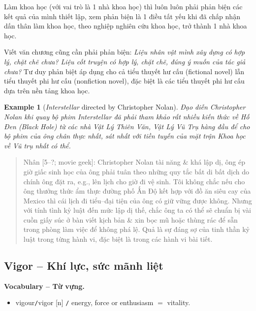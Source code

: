 \documentclass[12pt,oneside]{book}
\newtheorem{example}{Example}
\begin{document}
Làm khoa học (với vai trò là 1 nhà khoa học) thì luôn luôn phải phản biện các kết quả của mình thiết lập, xem phản biện là 1 điều tất yếu khi đã chấp nhận dấn thân làm khoa học, theo nghiệp nghiên cứu khoa học, trở thành 1 nhà khoa học.

Viết văn chương cũng cần phải phản biện: {\it Liệu nhân vật mình xây dựng có hợp lý, chặt chẽ chưa? Liệu cốt truyện có hợp lý, chặt chẽ, đúng ý muốn của tác giả chưa?} Tư duy phản biệt áp dụng cho cả tiểu thuyết hư cấu (fictional novel) lẫn tiểu thuyết phi hư cấu (nonfiction novel), đặc biệt là các tiểu thuyết phi hư cấu dựa trên nền tảng khoa học.

\begin{example}[{\it Interstellar} directed by {\sc Christopher Nolan}]
	Đạo diễn {\sc Christopher Nolan} khi quay bộ phim Interstellar đã phải tham khảo rất nhiều kiến thức về Hố Đen (Black Hole) từ các nhà Vật Lý Thiên Văn, Vật Lý Vũ Trụ hàng đầu để cho bộ phim của ông chân thực nhất, sát nhất với tiền tuyến của mặt trận Khoa học về Vũ trụ nhất có thể.
\end{example}

\begin{quote}
	{\sf Nhân [5--?; movie geek]}: {\sc Christopher Nolan} tài năng \& khá lập dị, ông ép giờ giấc sinh học của ông phải tuân theo những quy tắc bất di bất dịch do chính ông đặt ra, e.g., lên lịch cho giờ đi vệ sinh. Tôi không chắc nếu cho ông thưởng thức ẩm thực đường phố Ấn Độ kết hợp với đồ ăn siêu cay của Mexico thì cái lịch đi tiểu--đại tiện của ông có giữ vững được không. Nhưng với tính tình kỷ luật đến mức lập dị thế, chắc ông ta có thể sẽ chuẩn bị vài cuồn giấy súc ở bàn viết kịch bản \& xin bọc mũ hoặc thùng rác để sẵn trong phòng làm việc để không phá lệ. Quả là sự đáng sợ của tinh thần kỷ luật trong từng hành vi, đặc biệt là trong các hành vi bài tiết.
\end{quote}

\subsection{Vigor -- Khí lực, sức mãnh liệt}
\textbf{\textsf{\small Vocabulary -- Từ vựng.}}
\begin{itemize}\small
	\item {\sf vigour{\tt/}vigor} [n] {\tt/} energy, force or enthusiasm $=$ {\sf vitality}.
\end{itemize}
\end{document}
